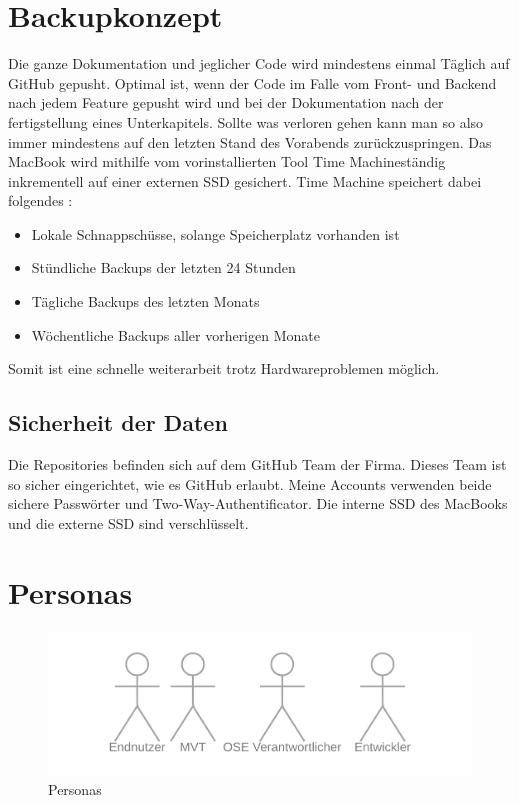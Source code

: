 \section{Backupkonzept}
Die ganze Dokumentation und jeglicher Code wird mindestens einmal Täglich auf GitHub gepusht. Optimal ist, wenn der Code im Falle vom Front- und Backend nach jedem Feature gepusht wird und bei der Dokumentation nach der fertigstellung eines Unterkapitels. Sollte was verloren gehen kann man so also immer mindestens auf den letzten Stand des Vorabends zurückzuspringen.
\newline
\newline
Das MacBook wird mithilfe vom vorinstallierten Tool \flqq Time Machine\frqq ständig inkrementell auf einer externen SSD gesichert. Time Machine speichert dabei folgendes \cite{apple_2021_mit}:
\begin{itemize}
  \item Lokale Schnappschüsse, solange Speicherplatz vorhanden ist
  \item Stündliche Backups der letzten 24 Stunden
  \item Tägliche Backups des letzten Monats
  \item Wöchentliche Backups aller vorherigen Monate
\end{itemize}
Somit ist eine schnelle weiterarbeit trotz Hardwareproblemen möglich.
\subsection{Sicherheit der Daten}
Die Repositories befinden sich auf dem GitHub Team der Firma. Dieses Team ist so sicher eingerichtet, wie es GitHub erlaubt. Meine Accounts verwenden beide sichere Passwörter und Two-Way-Authentificator.
\newline
Die interne SSD des MacBooks \cite{a2021_hardware} und die externe SSD \cite{a2021_keep} sind verschlüsselt.
\section{Personas}
\begin{figure}[!ht]
  \centering
  \includegraphics[width=0.6\linewidth]{./images/Personas.png}
  \caption[Personas]{Personas}
  \label{fig:personas}
\end{figure}
